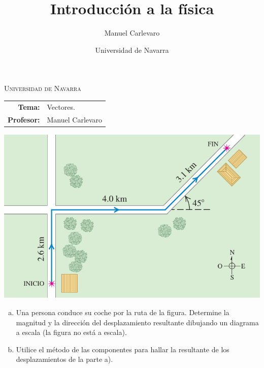 \documentclass[11pt]{article}
\title{Introducción a la física}
\author{Manuel Carlevaro}
\date{Universidad de Navarra}
\begin{document}

\begin{center}
\end{center} 

\begin{center}
\vspace{1em}
\Large{\textsc{Universidad de Navarra}} 
\end{center}

 \vspace{1em}

\begin{center}
\begin{tabular}{r l}
 \textbf{Tema:} & Vectores.\\
 \textbf{Profesor:} & Manuel Carlevaro \\
\end{tabular}\end{center}

\vspace{2em}

\begin{exercise}
\begin{multicols}{2}
\begin{center}
    \includegraphics[scale=0.35]{figs/ruta.png}
\end{center}
\begin{enumerate}[a)]
    \item Una persona conduce su coche por la ruta de la figura. Determine la magnitud y la dirección del desplazamiento resultante dibujando un diagrama a escala (la figura no está a escala).
    \item Utilice el método de las componentes para hallar la resultante de los desplazamientos de la parte a).
\end{enumerate}
\end{multicols}
\end{exercise}
\end{document}
